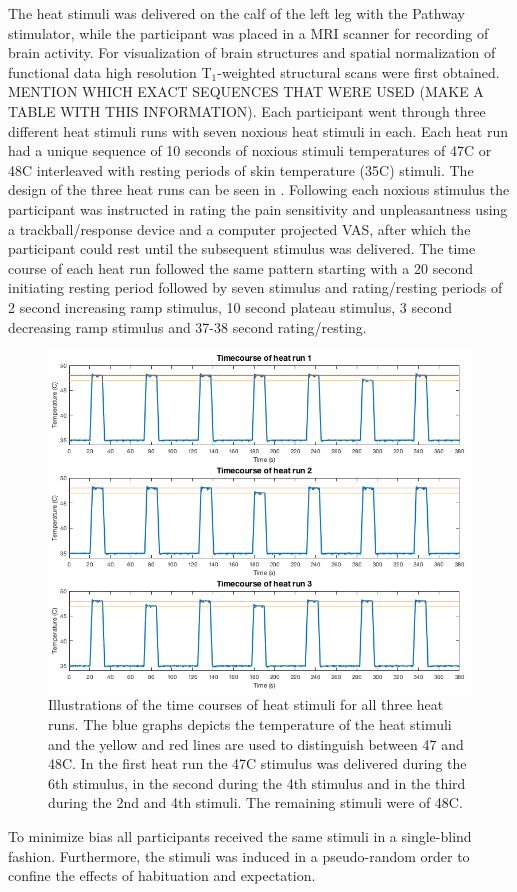 The heat stimuli was delivered on the calf of the left leg with the Pathway stimulator, while the participant was placed in a MRI scanner for recording of brain activity. For visualization of brain structures and spatial normalization of functional data high resolution T$_1$-weighted structural scans were first obtained.  MENTION WHICH EXACT SEQUENCES THAT WERE USED (MAKE A TABLE WITH THIS INFORMATION). 
Each participant went through three different heat stimuli runs with seven noxious heat stimuli in each. Each heat run had a unique sequence of 10 seconds of noxious stimuli temperatures of 47\degree C or 48\degree C interleaved with resting periods of skin temperature (35\degree C) stimuli. The design of the three heat runs can be seen in . 
Following each noxious stimulus the participant was instructed in rating the pain sensitivity and unpleasantness using a trackball/response device and a computer projected VAS, after which the participant could rest until the subsequent stimulus was delivered. The time course of each heat run followed the same pattern starting with a 20 second initiating resting period followed by seven stimulus and rating/resting periods of 2 second increasing ramp stimulus, 10 second plateau stimulus, 3 second decreasing ramp stimulus and 37-38 second rating/resting. 

\begin{figure}[H]                 
	\includegraphics[width=.95\textwidth]{figures/bMethods/Stim_design} 
	 \caption{Illustrations of the time courses of heat stimuli for all three heat runs. The blue graphs depicts the temperature of the heat stimuli and the yellow and red lines are used to distinguish between 47 and 48\degree C. In the first heat run the 47\degree C stimulus was delivered during the 6th stimulus, in the second during the 4th stimulus and in the third during the 2nd and 4th stimuli. The remaining stimuli were of 48\degree C.}
	\label{fig:meth:stimdesign} 
\end{figure}



To minimize bias all participants received the same stimuli in a single-blind fashion. Furthermore, the stimuli was induced in a pseudo-random order to confine the effects of habituation and expectation. 
